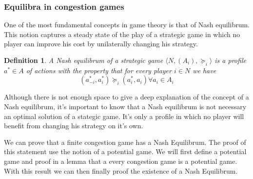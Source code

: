 \documentclass[a4paper,11pt]{article}
\newtheorem{definition}[theorem]{Definition}
\begin{document}
\subsubsection{Equilibra in congestion games}
One of the most fundamental concepts in game theory is that of Nash equilibrum. This notion captures a steady state of the play of a strategic game in which no player can improve his cost by unilaterally changing his strategy.

\begin{definition}\cite{2}
A Nash equilibrum of a strategic game $\langle N, (A_i), \succeq_i\rangle$ is a profile $a^* \in A$ of actions with the property that for every player $i \in N$ we have $$(a^*_{-i}, a^*_i) \succeq_i (a^*_{i}, a_i) \forall a_i \in A_i$$
\end{definition}
Although there is not enough space to give a deep explanation of the concept of a Nash equilibrum, it's important to know that a Nash equilibrum is not necessary an optimal solution of a stategic game. It's only a profile in which no player will benefit from changing his strategy on it's own.

We can prove that a finite congestion game has a Nash Equilibrum. The proof of this statement use the notion of a potential game. We will first define a potential game and proof in a lemma that a every congestion game is a potential game. With this result we can then finally proof the existence of a Nash Equilibrum.
\end{document}
